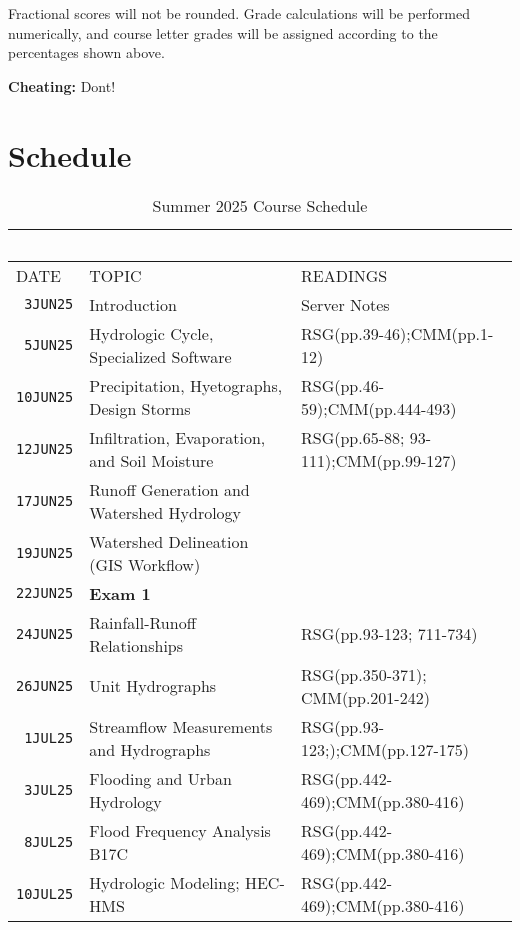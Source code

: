 \documentclass[12pt]{article}
\begin{document}
Fractional scores will not be rounded. Grade calculations will be performed numerically, and course letter grades will be assigned according to the percentages shown above.

\textbf{Cheating:} Dont!

\clearpage
\section*{Schedule}
\begin{table}[ht!]
   \centering
   \caption{Summer 2025 Course Schedule}
   \begin{tabular}{p{0.5in}p{3.0in}p{3.0in}} 
   ~ & ~ & ~  \\
\hline
DATE & TOPIC & READINGS  \\
\hline
\texttt{~3JUN25} & Introduction & Server Notes  \\ %
\texttt{~5JUN25} & Hydrologic Cycle, Specialized Software & RSG(pp.39-46);CMM(pp.1-12) \\ %
\texttt{10JUN25} & Precipitation, Hyetographs, Design Storms & RSG(pp.46-59);CMM(pp.444-493)\\ %
\texttt{12JUN25} & Infiltration, Evaporation, and Soil Moisture &  RSG(pp.65-88; 93-111);CMM(pp.99-127)\\ %
\texttt{17JUN25} & Runoff Generation and Watershed Hydrology \\ %
\texttt{19JUN25} & Watershed Delineation (GIS Workflow) & \\ %
\texttt{22JUN25} & \textbf{Exam 1} &  \\ %
\texttt{24JUN25} & Rainfall-Runoff Relationships & RSG(pp.93-123; 711-734)\\
\texttt{26JUN25} & Unit Hydrographs & RSG(pp.350-371); CMM(pp.201-242)\\
\texttt{~1JUL25} & Streamflow Measurements and Hydrographs & RSG(pp.93-123;);CMM(pp.127-175)\\
\texttt{~3JUL25} & Flooding and Urban Hydrology & RSG(pp.442-469);CMM(pp.380-416) \\ 
\texttt{~8JUL25} & Flood Frequency Analysis B17C & RSG(pp.442-469);CMM(pp.380-416)\\ %
\texttt{10JUL25} & Hydrologic Modeling; HEC-HMS & RSG(pp.442-469);CMM(pp.380-416) \\  %

\end{tabular}
\end{table}
\end{document}
